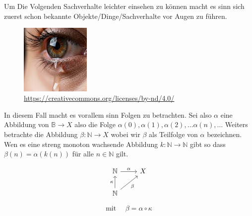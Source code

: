 \chapter{}

Um Die Volgenden Sachverhalte leichter einsehen zu können macht es sinn
sich zuerst schon bekannte Objekte/Dinge/Sachverhalte vor Augen zu führen.
\begin{figure}[h!]
 \centering
    \includegraphics[width=0.3\textwidth]{pictures/Auge.jpeg}
    \caption{\url{https://creativecommons.org/licenses/by-nd/4.0/}}
 \end{figure}

In diesem Fall macht es vorallem sinn Folgen zu betrachten.
Sei also $\alpha$ eine Abbildung von $\mathbb{B} \to X$ 
also die Folge $\alpha(0), \alpha(1), \alpha(2), \dots \alpha(n), \dots $
Weiters betrachte die Abbildung $\beta: \mathbb{N} \to X$
wobei wir $\beta$ als Teilfolge von $\alpha$ bezeichnen. Wen es eine streng
monoton wachsende Abbildung $k: \mathbb{N} \to \mathbb{N}$ gibt so dass
$\beta(n) = \alpha(k(n))$ für alle $n \in \mathbb{N}$ gilt.

$$
\begin{tikzcd}
\mathbb{N} \arrow[r, "\alpha"]  & X \\
\mathbb{N} \arrow[ur, "\beta"'] \arrow["\kappa", u] &
\end{tikzcd}
$$

$$
\text{mit } \quad \beta = \alpha \circ \kappa
$$

